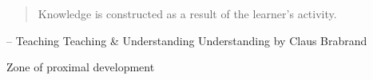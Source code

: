 \documentclass{beamer}
\begin{document}
\begin{frame}[standout]
  \begin{quote}
    Knowledge is constructed as a result of the learner's activity. \\[8mm]
  \end{quote}

  {\scriptsize -- Teaching Teaching \& Understanding Understanding by Claus Brabrand}

\end{frame}


\begin{frame}{Zone of proximal development}
  \vspace{4mm}
  \centering
  \begin{adjustbox}{width=0.7\columnwidth, keepaspectratio}
  \end{adjustbox}
\end{frame} 
\end{document}
